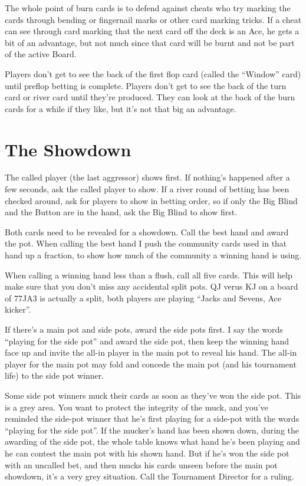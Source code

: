 The whole point of burn cards is to
defend against cheats who try marking the cards through bending or
fingernail marks or other card marking tricks.
If a cheat can see through card marking that the next card off the deck
is an Ace, he gets a bit of an advantage, but not much since that
card will be burnt and not be part of the active Board.

Players don't get to see the back of the first flop card (called
the ``Window'' card) until preflop betting is complete. Players
don't get to see the back of the turn card or river card until
they're produced. They can look at the back of the burn cards
for a while if they like, but it's not that big an advantage.

\section{The Showdown}

The called player (the last aggressor) shows first.
If nothing's happened after a few seconds, ask the called player to show.
If a river round of betting has been checked around, ask for
players to show in betting order, so if only the Big Blind and the Button
are in the hand, ask the Big Blind to show first.

Both cards need to be revealed for a showdown. Call the best
hand and award the pot. When calling the best hand I push the community
cards used in that hand up a fraction, to show how much of the community
a winning hand is using.

When calling a winning hand less than a flush, call all five cards.
This will help make sure that you don't miss any accidental split pots.
QJ verus KJ on a board of 77JA3 is actually a split, both players are
playing ``Jacks and Sevens, Ace kicker''.

If there's a main pot and side pots, award the side pots first.
I say the words ``playing for the side pot'' and award the side
pot, then keep the winning hand face up and invite the all-in
player in the main pot to reveal his hand. The all-in player
for the main pot may fold and concede the main pot (and his
tournament life) to the side pot winner.

Some side pot winners muck their cards as soon as
they've won the side pot. This is a grey area.
You want to protect the integrity of the muck, and you've reminded
the side-pot winner that he's first playing for a side-pot with the words
``playing for the side pot''.  If the mucker's hand has been
shown down, during the awarding of the side pot, the whole table knows
what hand he's been playing and he can contest the main pot with his
shown hand. But if he's won the side pot with an uncalled bet, and then mucks
his cards unseen before the main pot showdown, it's a very grey situation.
Call the Tournament Director for a ruling.

